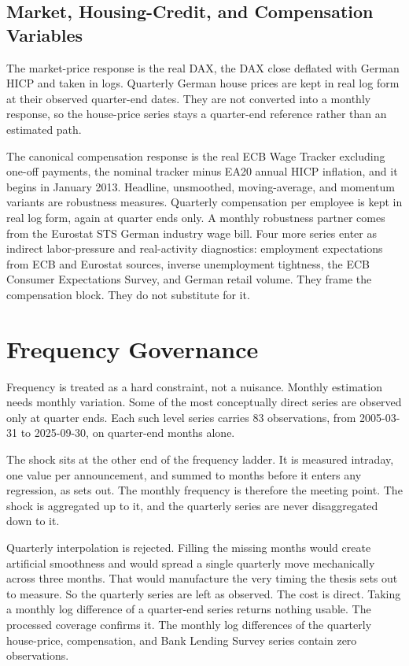 \subsection{Market, Housing-Credit, and Compensation Variables}

The market-price response is the real DAX, the DAX close \parencite{YahooDAX} deflated with German HICP \parencite{EurostatHICP} and taken in logs. Quarterly German house prices \parencite{FREDQDEN628BIS} are kept in real log form at their observed quarter-end dates. They are not converted into a monthly response, so the house-price series stays a quarter-end reference rather than an estimated path.

The canonical compensation response is the real ECB Wage Tracker excluding one-off payments, the nominal tracker minus EA20 annual HICP inflation, and it begins in January 2013. Headline, unsmoothed, moving-average, and momentum variants are robustness measures. Quarterly compensation per employee is kept in real log form, again at quarter ends only. A monthly robustness partner comes from the Eurostat STS German industry wage bill. Four more series enter as indirect labor-pressure and real-activity diagnostics: employment expectations from ECB and Eurostat sources, inverse unemployment tightness, the ECB Consumer Expectations Survey, and German retail volume. They frame the compensation block. They do not substitute for it.

\section{Frequency Governance}

Frequency is treated as a hard constraint, not a nuisance. Monthly estimation needs monthly variation. Some of the most conceptually direct series are observed only at quarter ends. Each such level series carries 83 observations, from 2005-03-31 to 2025-09-30, on quarter-end months alone.

The shock sits at the other end of the frequency ladder. It is measured intraday, one value per announcement, and summed to months before it enters any regression, as  sets out. The monthly frequency is therefore the meeting point. The shock is aggregated up to it, and the quarterly series are never disaggregated down to it.

Quarterly interpolation is rejected. Filling the missing months would create artificial smoothness and would spread a single quarterly move mechanically across three months. That would manufacture the very timing the thesis sets out to measure. So the quarterly series are left as observed. The cost is direct. Taking a monthly log difference of a quarter-end series returns nothing usable. The processed coverage confirms it. The monthly log differences of the quarterly house-price, compensation, and Bank Lending Survey series contain zero observations.

